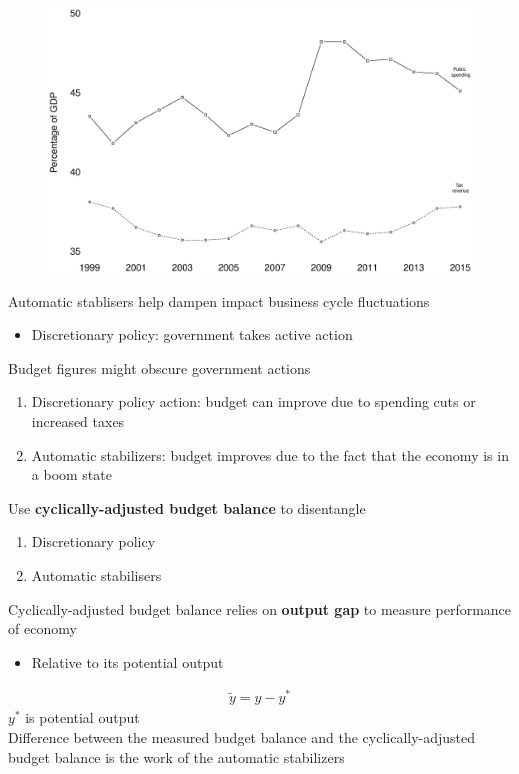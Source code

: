 \documentclass{beamer}
\begin{document}
\begin{frame}
  \begin{figure}
    \includegraphics[scale=.3]{automatic_stabilisers.eps}
  \end{figure}
\end{frame}

\begin{frame}
 Automatic stablisers help dampen impact business cycle fluctuations
  \begin{itemize}
    \item Discretionary policy: government takes active action
  \end{itemize}
  \medskip
  Budget figures might obscure government actions  
\begin{enumerate}
  \item Discretionary policy action: budget can improve due to spending cuts or increased taxes
  \item Automatic stabilizers: budget improves due to the fact that the economy is in a boom state
\end{enumerate}
\end{frame}

\begin{frame}
  Use \textbf{cyclically-adjusted budget balance} to disentangle
  \begin{enumerate}
    \item Discretionary policy
    \item Automatic stabilisers
  \end{enumerate}
  \medskip
  Cyclically-adjusted budget balance relies on \textbf{output gap} to measure performance of economy
  \begin{itemize}
    \item Relative to its potential output
  \end{itemize}
\begin{align}
  \tilde{y}=y-y^*
\end{align}
$y^*$ is potential output\\
Difference between the measured budget balance and the cyclically-adjusted budget balance is the work of the automatic stabilizers
\end{frame}
\end{document}
